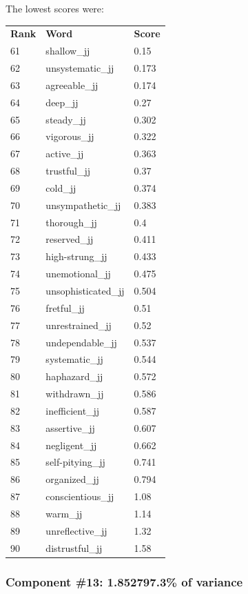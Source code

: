 \documentclass[10pt,letterpaper]{book}
\begin{document}
The lowest scores were:
\begin{tabular}{ l l l }
        \textbf{Rank} & \textbf{Word} & \textbf{Score} \\
        61 & shallow\_jj & 0.15 \\
        62 & unsystematic\_jj & 0.173 \\
        63 & agreeable\_jj & 0.174 \\
        64 & deep\_jj & 0.27 \\
        65 & steady\_jj & 0.302 \\
        66 & vigorous\_jj & 0.322 \\
        67 & active\_jj & 0.363 \\
        68 & trustful\_jj & 0.37 \\
        69 & cold\_jj & 0.374 \\
        70 & unsympathetic\_jj & 0.383 \\
        71 & thorough\_jj & 0.4 \\
        72 & reserved\_jj & 0.411 \\
        73 & high-strung\_jj & 0.433 \\
        74 & unemotional\_jj & 0.475 \\
        75 & unsophisticated\_jj & 0.504 \\
        76 & fretful\_jj & 0.51 \\
        77 & unrestrained\_jj & 0.52 \\
        78 & undependable\_jj & 0.537 \\
        79 & systematic\_jj & 0.544 \\
        80 & haphazard\_jj & 0.572 \\
        81 & withdrawn\_jj & 0.586 \\
        82 & inefficient\_jj & 0.587 \\
        83 & assertive\_jj & 0.607 \\
        84 & negligent\_jj & 0.662 \\
        85 & self-pitying\_jj & 0.741 \\
        86 & organized\_jj & 0.794 \\
        87 & conscientious\_jj & 1.08 \\
        88 & warm\_jj & 1.14 \\
        89 & unreflective\_jj & 1.32 \\
        90 & distrustful\_jj & 1.58 \\
\end{tabular}
\subsubsection{Component \#13: 1.852797.3\% of variance}
\end{document}
